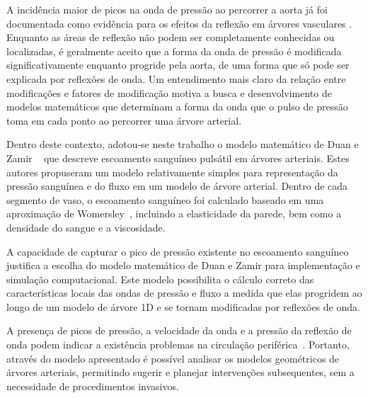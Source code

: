 
A incidência maior de picos na onda de pressão ao percorrer a aorta já foi documentada como evidência para os efeitos da reflexão em árvores vasculares \cite{Kouchoukos,Lighthill,McDonald}. Enquanto as áreas de reflexão não podem ser completamente conhecidas ou localizadas, é geralmente aceito que a forma da onda de pressão é modificada significativamente enquanto progride pela aorta, de uma forma que só pode ser explicada por reflexões de onda.  Um entendimento mais claro da relação entre modificações e fatores de modificação motiva a busca e desenvolvimento de modelos matemáticos que determinam a forma da onda que o pulso de pressão toma em cada ponto ao percorrer uma árvore arterial. 

Dentro deste contexto, adotou-se neste trabalho o modelo matemático de Duan e Zamir ~\cite{Duan,Duan1992} que descreve escoamento sanguíneo pulsátil em árvores arteriais. Estes autores propuseram um modelo relativamente simples para representação da pressão sanguínea e do fluxo em um modelo de árvore arterial. Dentro de cada segmento de vaso, o escoamento sanguíneo foi calculado baseado em uma aproximação de Womersley~\cite{Womersley}, incluindo a elasticidade da parede, bem como a densidade do sangue e a viscosidade.

A capacidade de capturar o pico de pressão existente no escoamento sanguíneo justifica a escolha do modelo matemático de Duan e Zamir para implementação e simulação computacional. Este modelo possibilita o cálculo correto das características locais das ondas de pressão e fluxo a medida que elas progridem ao longo de um modelo de árvore 1D e se tornam modificadas por reflexões de onda.

A presença de picos de pressão, a velocidade da onda e a pressão da reflexão de onda podem indicar a existência problemas na circulação periférica~\cite{TAKAHASHI202129}. Portanto, através do modelo apresentado é possível analisar os modelos geométricos de árvores arteriais, permitindo sugerir e planejar intervenções subsequentes, sem a necessidade de procedimentos invasivos.


